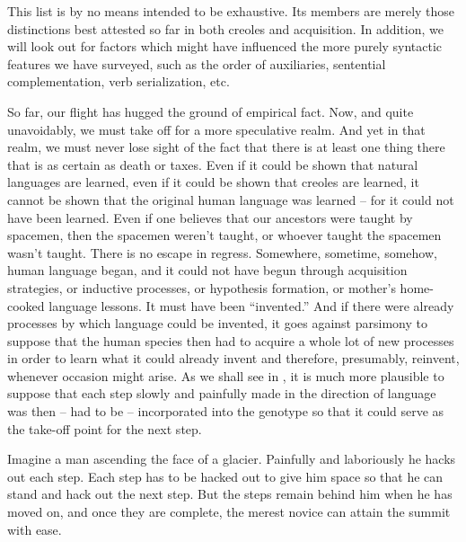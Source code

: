 This list is by no means intended to be exhaustive. Its members are merely those distinctions best attested so far in both creoles and acquisition. In addition, we will look out for factors which might have influenced the more purely syntactic features we have surveyed, such as the order of auxiliaries, sentential complementation, verb serialization, etc.

So far, our flight has hugged the ground of empirical fact. Now,
and quite unavoidably, we must take off for a more speculative realm. And yet in that realm, we must never lose sight of the fact that there is at least one thing there that is as certain as death or taxes. Even if it could be shown that natural languages are learned, even if it could be shown that creoles are learned, it cannot be shown that the original human language was learned -- for it could not have been learned. Even if one believes that our ancestors were taught by spacemen, then the spacemen weren't taught, or whoever taught the spacemen wasn't taught. There is no escape in regress. Somewhere, sometime, somehow, human language began, and it could not have begun through acquisition strategies, or inductive processes, or hypothesis formation, or mother's home-cooked language lessons. It must have been ``invented.'' And if there were already processes by which language could be invented, it goes against parsimony to suppose that the human species then had to acquire a whole lot of new processes in order to learn what it could already invent and therefore, presumably, reinvent, whenever occasion might arise. As we shall see in , it is much more plausible to suppose that each step slowly and painfully made in the direction of language was then -- had to be -- incorporated into the genotype so that it could serve as the take-off point for the next step.

Imagine a man ascending the face of a glacier. Painfully and laboriously he hacks out each step. Each step has to be hacked out to give him space so that he can stand and hack out the next step. But the steps remain behind him when he has moved on, and once they are complete, the merest novice can attain the summit with ease.